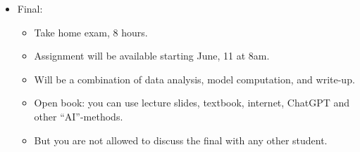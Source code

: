 \documentclass[12pt]{article}
\begin{document}
\begin{itemize}
\begin{itemize}
	\end{itemize}
	\item Final:
	\begin{itemize}
		\item Take home exam, 8 hours.
		\item Assignment will be available starting June, 11 at 8am.
		\item Will be a combination of data analysis, model computation, and write-up.
		\item Open book: you can use lecture slides, textbook, internet, ChatGPT and other ``AI''-methods.
		\item But you are not allowed to discuss the final with any other student.
	\end{itemize}

\end{itemize}
\end{document}
